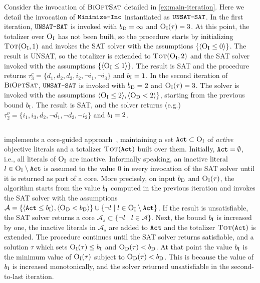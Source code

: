 \begin{example}
  Consider the invocation of $\textsc{BiOptSat}$ detailed in \cref{ex:main-iteration}. 
  Here we detail the invocation of $\texttt{Minimize-\allowbreak{}Inc}$ instantiated as $\texttt{UNSAT-\allowbreak{}SAT}$.
  In the first iteration, $\texttt{UNSAT-\allowbreak{}SAT}$ is invoked with $b_{\text{D}} =\infty$ and $\textsc{O}_{\text{I}}(\tau) = 3$.
  At this point, the totalizer over $\textsc{O}_{\text{I}}$ has not been built, so the procedure starts by initializing $\textsc{Tot}(\textsc{O}_{\text{I}}, 1)$ and invokes the SAT solver with the assumptions $\{\langle \textsc{O}_{\text{I}} \leq 0 \rangle\}$.
  The result is UNSAT, so the totalizer is extended to $\textsc{Tot}(\textsc{O}_{\text{I}}, 2)$ and the SAT solver invoked with the assumptions $\{ \langle \textsc{O}_{\text{I}} \leq 1 \rangle\}$.
  The result is SAT and the procedure returns $\tau^c_3 = \{ d_1,  d_2, d_3, i_2, \lnot i_1, \lnot i_3\}$ and $b_{\text{I}} = 1$. 
  In the second iteration of $\textsc{BiOptSat}$, $\texttt{UNSAT-\allowbreak{}SAT}$ is invoked with $b_{\text{D}} = 2$ and $\textsc{O}_{\text{I}}(\tau) = 3$.
  The solver is invoked with the assumptions $\langle \textsc{O}_{\text{I}} \leq 2 \rangle, \langle \textsc{O}_{\text{D}} < 2 \rangle\}$, starting from the previous bound $b_{\text{I}}$.
  The result is SAT, and the solver returns (e.g.)\ $\tau^o_2 = \{ i_1, i_3, d_2, \lnot d_1, \lnot d_3, \lnot i_2\}$ and $b_{\text{I}} = 2$.
\end{example}

\subsection{\msu{}\label{sec:msu3}}

\msu{} implements a core-guided approach~\autocite{DBLP:journals/corr/abs-0712-1097,DBLP:conf/sat/AnsoteguiBL09}, maintaining a set $\texttt{Act} \subset \textsc{O}_{\text{I}}$ of \emph{active} objective literals and a totalizer $\textsc{Tot}(\texttt{Act})$ built over them. 
Initially, $\texttt{Act} = \emptyset$, i.e., all literals of $\textsc{O}_{\text{I}}$ are inactive.
Informally speaking, an inactive literal $l \in \textsc{O}_{\text{I}} \setminus \texttt{Act}$ is assumed to the value $0$ in every invocation of the SAT solver until it is returned as part of a core.
More precisely, on input $b_{\text{D}}$ and $\textsc{O}_{\text{I}}(\tau)$, the algorithm starts from the value $b_{\text{I}}$ computed in the previous iteration and invokes the SAT solver with the assumptions $\mathcal{A} = \{\langle \texttt{Act} \leq b_{\text{I}} \rangle, \langle \textsc{O}_{\text{D}} < b_{\text{D}} \rangle  \} \cup \{ \lnot l \mid l \in \textsc{O}_{\text{I}} \setminus \texttt{Act}\}$.
If the result is unsatisfiable, the SAT solver returns a core $\mathcal{A}_s \subset \{\lnot l \mid l \in \mathcal{A}\}$.
Next, the bound $b_{\text{I}}$ is increased by one, the inactive literals in $\mathcal{A}_s$ are added to $\texttt{Act}$ and the totalizer $\textsc{Tot}(\texttt{Act})$ is extended.
The procedure continues until the SAT solver returns satisfiable, and a solution $\tau$ which sets $\textsc{O}_{\text{I}}(\tau) \leq b_{\text{I}}$ and $\textsc{O}_{\text{D}}(\tau) < b_{\text{D}}$.
At that point the value $b_{\text{I}}$ is the minimum value of $\textsc{O}_{\text{I}}(\tau)$ subject to $\textsc{O}_{\text{D}}(\tau) < b_{\text{D}}$.
This is because the value of $b_{\text{I}}$ is increased monotonically, and the solver returned unsatisfiable in the second-to-last iteration. 

